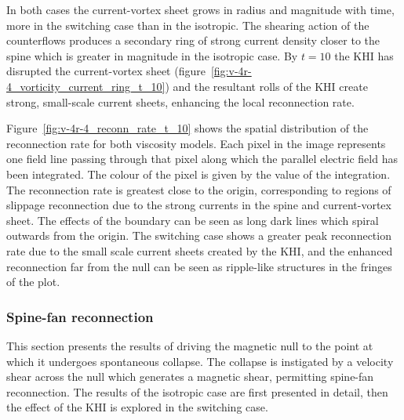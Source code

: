 In both cases the current-vortex sheet grows in radius and magnitude with time, more in the switching case than in the isotropic. The shearing action of the counterflows produces a secondary ring of strong current density closer to the spine which is greater in magnitude in the isotropic case. By $t=10$ the KHI has disrupted the current-vortex sheet (figure~\ref{fig:v-4r-4_vorticity_current_ring_t_10}) and the resultant rolls of the KHI create strong, small-scale current sheets, enhancing the local reconnection rate. 

Figure~\ref{fig:v-4r-4_reconn_rate_t_10} shows the spatial distribution of the reconnection rate for both viscosity models. Each pixel in the image represents one field line passing through that pixel along which the parallel electric field has been integrated. The colour of the pixel is given by the value of the integration. The reconnection rate is greatest close to the origin, corresponding to regions of slippage reconnection due to the strong currents in the spine and current-vortex sheet. The effects of the boundary can be seen as long dark lines which spiral outwards from the origin. The switching case shows a greater peak reconnection rate due to the small scale current sheets created by the KHI, and the enhanced reconnection far from the null can be seen as ripple-like structures in the fringes of the plot.

\subsubsection{Spine-fan reconnection}

This section presents the results of driving the magnetic null to the point at which it undergoes spontaneous collapse. The collapse is instigated by a velocity shear across the null which generates a magnetic shear, permitting spine-fan reconnection. The results of the isotropic case are first presented in detail, then the effect of the KHI is explored in the switching case.

